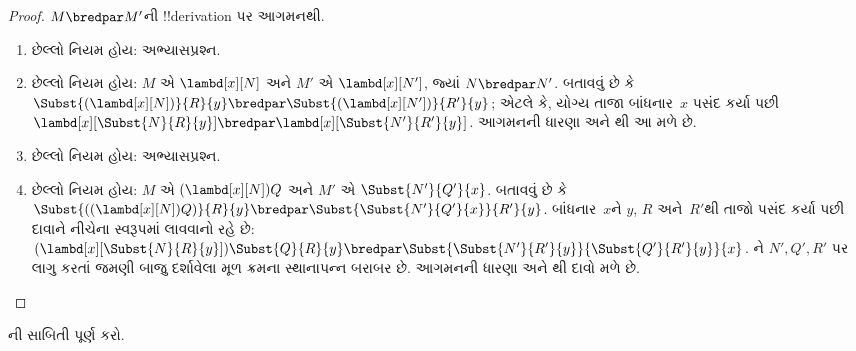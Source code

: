 \documentclass[../../../include/open-logic-section]{subfiles}
\begin{document}
\begin{proof}
  $M \bredpar M'$ની !!{derivation} પર આગમનથી.
  \begin{enumerate}
    \item છેલ્લો નિયમ  હોય: અભ્યાસપ્રશ્ન.
    \item છેલ્લો નિયમ  હોય:
      $M$ એ $\lambd[x][N]$ અને $M'$ એ $\lambd[x][N']$,
      જ્યાં $N \bredpar N'$. બતાવવું છે કે
      $\Subst{(\lambd[x][N])}{R}{y} \bredpar
      \Subst{(\lambd[x][N'])}{R'}{y}$; એટલે કે,
      યોગ્ય તાજા બાંધનાર~$x$ પસંદ કર્યા પછી
      $\lambd[x][\Subst{N}{R}{y}] \bredpar
      \lambd[x][\Subst{N'}{R'}{y}]$.
      આગમનની ધારણા અને થી આ મળે છે.
    \item છેલ્લો નિયમ  હોય: અભ્યાસપ્રશ્ન.
    \item છેલ્લો નિયમ  હોય:
      $M$ એ $(\lambd[x][N])Q$ અને
      $M'$ એ $\Subst{N'}{Q'}{x}$. બતાવવું છે કે
      $\Subst{((\lambd[x][N])Q)}{R}{y} \bredpar
      \Subst{\Subst{N'}{Q'}{x}}{R'}{y}$.
      બાંધનાર~$x$ને $y$, $R$ અને~$R'$થી તાજો
      પસંદ કર્યા પછી દાવાને નીચેના સ્વરૂપમાં લાવવાનો રહે છે:
      $(\lambd[x][\Subst{N}{R}{y}])\Subst{Q}{R}{y} \bredpar
      \Subst{\Subst{N'}{R'}{y}}{\Subst{Q'}{R'}{y}}{x}$.
      ને $N',Q',R'$ પર લાગુ કરતાં
      જમણી બાજુ દર્શાવેલા મૂળ ક્રમના સ્થાનાપન્ન બરાબર છે.
      આગમનની ધારણા અને થી દાવો મળે છે.
  \end{enumerate}
\end{proof}

\begin{prob}
  ની સાબિતી પૂર્ણ કરો.
\end{prob}
\end{document}
